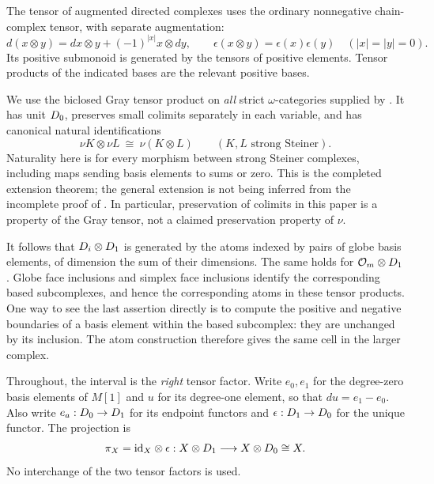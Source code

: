 The tensor of augmented directed complexes uses the ordinary
nonnegative chain-complex tensor, with separate augmentation:
\begin{equation}\label{eq:tensor-differential}
 d(x\otimes y)=dx\otimes y+(-1)^{|x|}x\otimes dy,
 \qquad
 \epsilon(x\otimes y)=\epsilon(x)\epsilon(y)
 \quad(|x|=|y|=0).
\end{equation}
Its positive submonoid is generated by the tensors of positive
elements.  Tensor products of the indicated bases are the relevant
positive bases.

We use the biclosed Gray tensor product on \emph{all} strict
$\omega$-categories supplied by
\cite[Theorem~A.15 and \S A.16]{AraMaltsiniotis2020}.
It has unit $D_{0}$, preserves small colimits separately in each
variable, and has canonical natural identifications
\begin{equation}\label{eq:steiner-tensor}
 \nu K\otimes\nu L\ \cong\ \nu(K\otimes L)
 \qquad(K,L\text{ strong Steiner}).
\end{equation}
Naturality here is for every morphism between strong Steiner
complexes, including maps sending basis elements to sums or zero.
This is the completed extension theorem; the general extension is
not being inferred from the incomplete proof of
\cite[Theorem~7.3]{Steiner2004}.
In particular, preservation of colimits in this paper is a property
of the Gray tensor, not a claimed preservation property of $\nu$.

It follows that $D_{i}\otimes D_{1}$ is generated by the atoms
indexed by pairs of globe basis elements, of dimension the sum of
their dimensions.  The same holds for
$\mathcal O_{m}\otimes D_{1}$.  Globe face inclusions and simplex face
inclusions identify the corresponding based subcomplexes, and hence
the corresponding atoms in these tensor products.  One way to see the
last assertion directly is to compute the positive and negative
boundaries of a basis element within the based subcomplex: they are
unchanged by its inclusion.  The atom construction therefore gives
the same cell in the larger complex.

Throughout, the interval is the \emph{right} tensor factor.  Write
$e_0,e_1$ for the degree-zero basis elements of $M[1]$ and $u$ for its
degree-one element, so that $du=e_1-e_0$.  Also write
$e_a:D_{0}\to D_{1}$ for its endpoint functors and
$\epsilon:D_{1}\to D_{0}$ for the unique functor.  The projection
is
\[
 \pi_X=\mathrm{id}_X\otimes\epsilon:
 X\otimes D_{1}\longrightarrow X\otimes D_{0}\cong X.
\]
No interchange of the two tensor factors is used.


